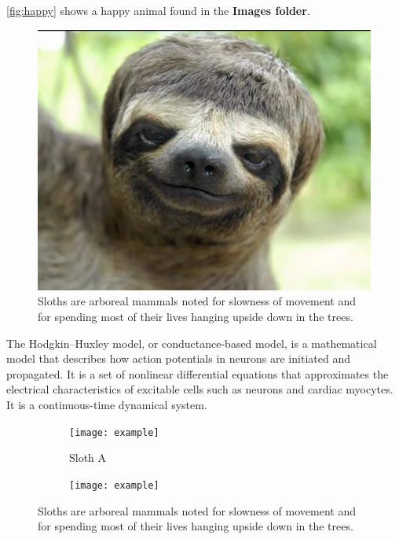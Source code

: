 \autoref{fig:happy} shows a happy animal found in the \textbf{Images folder}. 
\begin{figure}[H]
\begin{center}\includegraphics[scale=0.5]{./3_Images/Funny-Animal-Face} 
\end{center}
\caption{Sloths are arboreal mammals noted for slowness of movement and for spending most of their lives hanging upside down in the trees.}
\label{fig:happy}
\end{figure}

The Hodgkin–Huxley model, or conductance-based model, is a mathematical model that describes how action potentials in neurons are initiated and propagated. It is a set of nonlinear differential equations that approximates the electrical characteristics of excitable cells such as neurons and cardiac myocytes. It is a continuous-time dynamical system.


\begin{figure}[hbt!]
    \centering
    \begin{subfigure}[c]{.45\linewidth}
        \texttt{[image: example]} 
        \caption{Sloth A}
    \end{subfigure}
    \begin{subfigure}[c]{.45\linewidth}
        \texttt{[image: example]} 
        \caption{}
    \end{subfigure}
    \caption{Sloths are arboreal mammals noted for slowness of movement and for spending most of their lives hanging upside down in the trees.}
    \label{fig:my_label}
\end{figure}


